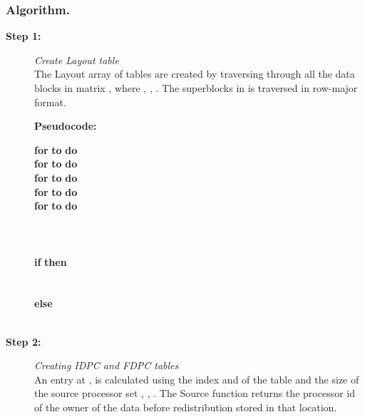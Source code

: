 \documentclass[letterpaper]{llncs}
\begin{document}
\subsubsection{Algorithm.}
\begin{description}
\item[\textbf{Step 1:}] \hspace{0.05in}\textit{Create Layout table}\\
The Layout array of tables are created by traversing through all the data blocks in 
matrix , where , , . The superblocks in  is traversed in row-major format.  

\textbf{Pseudocode:}
\vspace{-0.1in}
\begin{tabbing}
\hspace{0.3in}\textbf{for}  \textbf{to}  \textbf{do}\\ 
\hspace{0.5in}   \textbf{for}   \textbf{to}  \textbf{do} \\
\hspace{0.7in}    \textbf{for}   \textbf{to}  \textbf{do}\\
\hspace{0.9in}     \textbf{for}   \textbf{to}  \textbf{do}\\
\hspace{1.1in}      \textbf{for}   \textbf{to}  \textbf{do}\\ 
\hspace{1.3in}            \\
\hspace{2.2in}             \\
\hspace{2.2in}   	       \\

\hspace{0.5in} \textbf{if} \textbf{then}\\
\hspace{0.7in}	\\
\hspace{0.7in}	\\
\hspace{0.5in}\textbf{else}\\
\hspace{0.7in}	\\
\end{tabbing}
\vspace{-0.2in}
\item[\textbf{Step 2:}] \hspace{0.05in}\textit{Creating IDPC and FDPC tables}\\
An entry at ,   is calculated using the index  and  of the table and 
the size of the source processor set , , . 
The Source function returns the processor id of the owner of the data before redistribution stored in that location.


\end{description}
\end{document}
